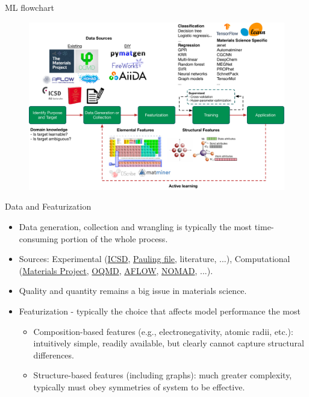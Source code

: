 \documentclass{beamer}
\begin{document}
\begin{frame}{ML flowchart}
\begin{figure}
    \centering
    \includegraphics[width=\textwidth]{figures/ml_flowchart.pdf}
\end{figure}
\end{frame}


\begin{frame}{Data and Featurization}
    \begin{itemize}
        \item Data generation, collection and wrangling is typically the most time-consuming portion of the whole process.
        \item Sources: Experimental (\href{http://icsd.fiz-karlsruhe.de/icsd/}{ICSD}, \href{http://paulingfile.com/}{Pauling file}, literature, ...), Computational (\href{http://www.materialsproject.org}{Materials Project}, \href{http://oqmd.org/}{OQMD}, \href{http://aflowlib.org/}{AFLOW}, \href{https://nomad-coe.eu/}{NOMAD}, ...).
        \item Quality and quantity remains a big issue in materials science.
        \item Featurization - typically the choice that affects model performance the most
        \begin{itemize}
            \item Composition-based features (e.g., electronegativity, atomic radii, etc.): intuitively simple, readily available, but clearly cannot capture structural differences.
            \item Structure-based features (including graphs): much greater complexity, typically must obey symmetries of system to be effective.
        \end{itemize}
    \end{itemize}
\end{frame}
\end{document}
